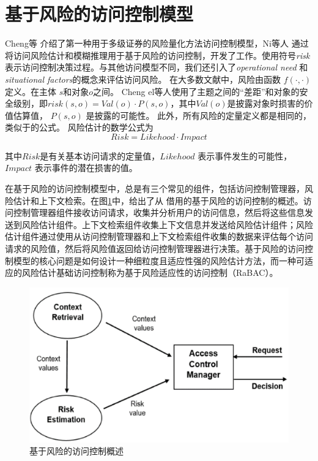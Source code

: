 \section{基于风险的访问控制模型}
\label{sec:preliminaries}

Cheng等\cite{cheng2007fuzzy} 介绍了第一种用于多级证券的风险量化方法访问控制模型，Ni等人\cite{ni2010risk} 通过将访问风险估计和模糊推理用于基于风险的访问控制，开发了工作\cite{cheng2007fuzzy}。使用符号\emph{risk}表示访问控制决策过程。与其他访问模型不同，我们还引入了\emph{operational need} 和\emph{situational factors}的概念来评估访问风险。 在大多数文献\cite{cheng2007fuzzy,ni2010risk,kandala2011,bijon2012}中，风险由函数 $f(\cdot, \cdot)$定义。在主体 $s$和对象$o$之间。 Cheng el等人\cite{cheng2007fuzzy}使用了主题之间的“差距”和对象的安全级别，即$risk(s,o)=Val(o) \cdot P(s,o)$，其中$Val(o)$是披露对象时损害的价值估算值， $P(s,o)$ 是披露的可能性。 此外，所有风险的定量定义都是相同的，类似于\cite{cheng2007fuzzy}的公式。 风险估计的数学公式为
\begin{equation}\label{eq:naive_risk}
Risk = Likehood \cdot Impact
\end{equation}

其中$Risk$是有关基本访问请求的定量值，$Likehood$ 表示事件发生的可能性，$Impact$ 表示事件的潜在损害的值。


在基于风险的访问控制模型中，总是有三个常见的组件，包括访问控制管理器，风险估计和上下文检索。在图\ref{fig:rbac}中，给出了从 \cite{diep2007}借用的基于风险的访问控制的概述。访问控制管理器组件接收访问请求，收集并分析用户的访问信息，然后将这些信息发送到风险估计组件。上下文检索组件收集上下文信息并发送给风险估计组件；风险估计组件通过使用从访问控制管理器和上下文检索组件收集的数据来评估每个访问请求的风险值，然后将风险值返回给访问控制管理器进行决策。基于风险的访问控制模型的核心问题是如何设计一种细粒度且适应性强的风险估计方法，而一种可适应的风险估计基础访问控制称为基于风险适应性的访问控制（RaBAC）。
\begin{figure}[htb]
	\centering
	\includegraphics[width=.85\textwidth]{./figures/fig-rbac.jpg}
	\caption{基于风险的访问控制概述\cite{diep2007}}\label{fig:rbac}
\end{figure}

